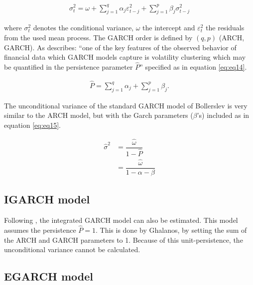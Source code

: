 \documentclass[a4paper, twoside]{templates/ociamthesis}
\begin{document}
\begin{align}
\sigma_t^2 = \omega  + \sum\limits_{j = 1}^q {{\alpha_j}\varepsilon _{t-j}^2 +} \sum\limits_{j=1}^p {{\beta_j}\sigma_{t-j}^2} 
 \label{eq:eq13}
\end{align}

\noindent where \(\sigma_t^2\) denotes the conditional variance, \(\omega\) the intercept and \(\varepsilon_t^2\) the residuals from the used mean process. The GARCH order is defined by \((q, p)\) (ARCH, GARCH). As \textcite{ghalanos2020} describes: ``one of the key features of the observed behavior of financial data which GARCH models capture is volatility clustering which may be quantified in the persistence parameter \(\hat{P}\)'' specified as in equation \eqref{eq:eq14}.

\begin{align}
\hat{P} = \sum\limits_{j = 1}^q {{\alpha_j}}  + \sum\limits_{j = 1}^p {{\beta_j}}.
 \label{eq:eq14}
\end{align}

\noindent The unconditional variance of the standard GARCH model of Bollerslev is very similar to the ARCH model, but with the Garch parameters (\(\beta\)'s) included as in equation \eqref{eq:eq15}.

\begin{equation}
\begin{split}
\hat{\sigma}^2 
&= \dfrac{\hat{\omega}}{1 - \hat{P}} \\
&= \dfrac{\hat{\omega}}{1 - \alpha - \beta}
\end{split}
 \label{eq:eq15}
\end{equation}

\hypertarget{igarch-model}{%
\subsection{IGARCH model}\label{igarch-model}}

\noindent Following \textcite{ghalanos2020}, the integrated GARCH model \autocite{bollerslev1986} can also be estimated. This model assumes the persistence \(\hat{P} = 1\). This is done by Ghalanos, by setting the sum of the ARCH and GARCH parameters to 1. Because of this unit-persistence, the unconditional variance cannot be calculated.

\newpage

\hypertarget{egarch-model}{%
\subsection{EGARCH model}\label{egarch-model}}
\end{document}
